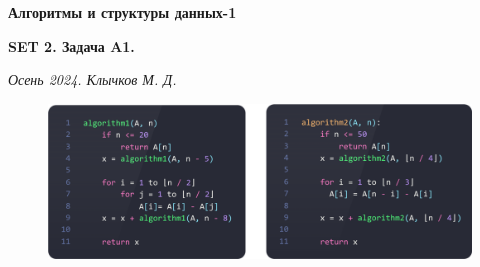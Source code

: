 \documentclass[11pt,a4paper]{scrarticle}
\author{Клычков Максим Дмитриевич}
\theoremstyle{definition}
\begin{document}
\centerline{\textbf{\huge Алгоритмы и структуры данных-1}}
\centerline{\textbf{SET 2. Задача A1.}}
\begin{flushright}
	\emph{Осень 2024. Клычков М. Д.}
\end{flushright}

\begin{figure}[htp]
	\centering
	\includegraphics[width=\textwidth]{code.png}
\end{figure}
\end{document}
